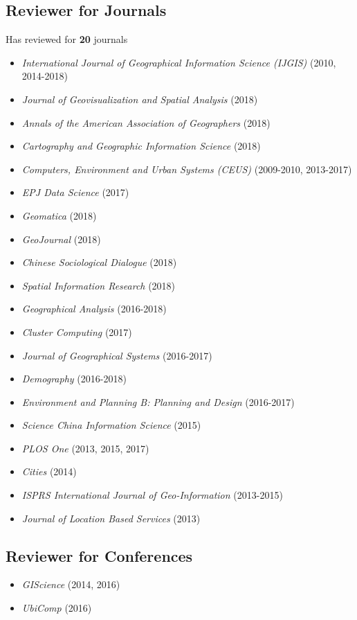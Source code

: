 \documentclass[11pt, a4paper]{article}
\begin{document}
\subsection*{Reviewer for Journals}
Has reviewed for \textbf{20} journals
\begin{itemize}
  \item \emph{International Journal of Geographical Information Science (IJGIS)} (2010, 2014-2018)
  \item \emph{Journal of Geovisualization and Spatial Analysis} (2018)
  \item \emph{Annals of the American Association of Geographers} (2018)
  \item \emph{Cartography and Geographic Information Science} (2018)
  \item \emph{Computers, Environment and Urban Systems (CEUS)} (2009-2010, 2013-2017)
  \item \emph{EPJ Data Science} (2017)
  \item \emph{Geomatica} (2018)
  \item \emph{GeoJournal} (2018)
  \item \emph{Chinese Sociological Dialogue} (2018)
  \item \emph{Spatial Information Research} (2018)
  \item \emph{Geographical Analysis} (2016-2018)
  \item \emph{Cluster Computing} (2017)
  \item \emph{Journal of Geographical Systems} (2016-2017)
  \item \emph{Demography} (2016-2018)
  \item \emph{Environment and Planning B: Planning and Design} (2016-2017)
  \item \emph{Science China Information Science} (2015)
  \item \emph{PLOS One} (2013, 2015, 2017)
  \item \emph{Cities} (2014)
  \item \emph{ISPRS International Journal of Geo-Information} (2013-2015)
  \item \emph{Journal of Location Based Services} (2013)
\end{itemize} 

\subsection*{Reviewer for Conferences}
\begin{itemize}
  \item \emph{GIScience} (2014, 2016)
  \item \emph {UbiComp} (2016)
\end{itemize}
\end{document}
